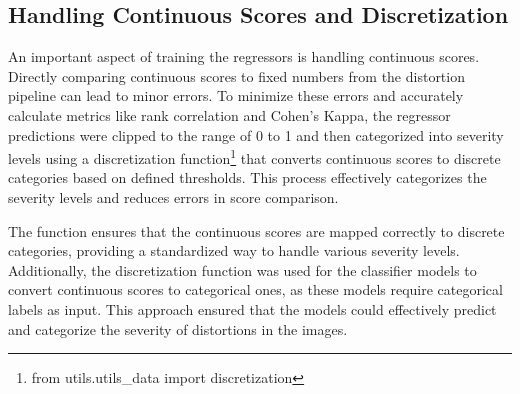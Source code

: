 \subsection{Handling Continuous Scores and Discretization}
\label{sub:ContScore}
An important aspect of training the regressors is handling continuous scores. Directly comparing continuous scores to fixed numbers from the distortion pipeline can lead to minor errors. To minimize these errors and accurately calculate metrics like rank correlation and Cohen’s Kappa, the regressor predictions were clipped to the range of 0 to 1 and then categorized into severity levels using a discretization function\footnote{from utils.utils\_data import discretization} that converts continuous scores to discrete categories based on defined thresholds. This process effectively categorizes the severity levels and reduces errors in score comparison.\par
\vspace{\baselineskip}
\noindent
The function ensures that the continuous scores are mapped correctly to discrete categories, providing a standardized way to handle various severity levels. Additionally, the discretization function was used for the classifier models to convert continuous scores to categorical ones, as these models require categorical labels as input. This approach ensured that the models could effectively predict and categorize the severity of distortions in the images. \par

